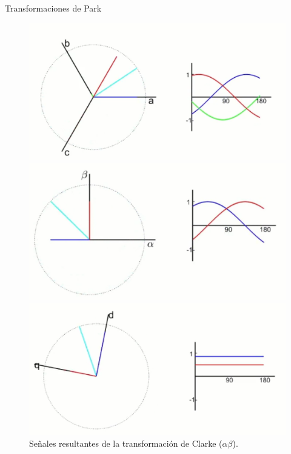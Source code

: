 \documentclass[12pt]{beamer}
\begin{document}
\begin{frame}{Transformaciones de Park}
    \footnotesize
    \captionsetup{font=footnotesize} %
    \begin{figure}[H]
        \centering
        \begin{minipage}[t]{0.35\textwidth}
            \centering
            \includegraphics[width=\textwidth]{Imagenes/SistTrifasico(marcoABC).png}
            \caption{Componentes de un sistema trifásico (de un marco abc).}
        \end{minipage}
        \hfill
        \begin{minipage}[t]{0.35\textwidth}
            \centering
            \includegraphics[width=\textwidth]{Imagenes/TransformadaClark.png}
            \caption{Señales resultantes de la transformación de Clarke (\(\alpha \beta\)).}
        \end{minipage}
        \vspace{0.25cm}
        \begin{minipage}[t]{0.35\textwidth}
            \centering
            \includegraphics[width=\textwidth]{Imagenes/TransformadaPark.png}

\end{minipage}
\end{figure}
\end{frame}
\end{document}
